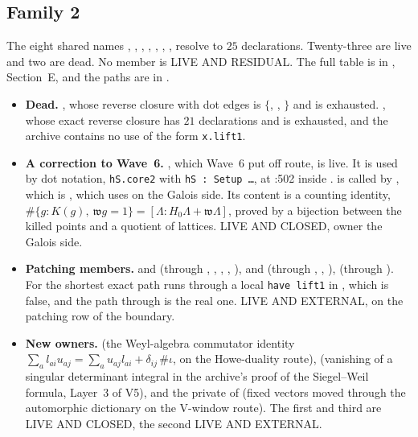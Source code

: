 \documentclass[11pt]{article}
\theoremstyle{remark}
\begin{document}
\subsection{Family 2}

The eight shared names , , , , , , ,  resolve to $25$ declarations. Twenty-three are live and two are dead. No member is LIVE AND RESIDUAL. The full table is in , Section~E, and the paths are in .

\begin{itemize}[nosep]
\item \textbf{Dead.} , whose reverse closure with dot edges is $\{$, , $\}$ and is exhausted. , whose exact reverse closure has $21$ declarations and is exhausted, and the archive contains no use of the form \texttt{x.lift1}.
\item \textbf{A correction to Wave~6.} , which Wave~6 put off route, is live. It is used by dot notation, \texttt{hS.core2} with \texttt{hS : Setup \ldots}, at :502 inside .  is called by , which is , which  uses on the Galois side. Its content is a counting identity, $\#\{g:K(g),\ \mathfrak w g=1\}=[\Lambda:H_0\Lambda+\mathfrak w\Lambda]$, proved by a bijection between the killed points and a quotient of lattices. LIVE AND CLOSED, owner the Galois side.
\item \textbf{Patching members.}  and  (through , , , , ),  and  (through , , ),  (through ). For  the shortest exact path runs through a local \texttt{have lift1} in , which is false, and the path through  is the real one. LIVE AND EXTERNAL, on the patching row of the boundary.
\item \textbf{New owners.}  (the Weyl-algebra commutator identity $\sum_al_{ai}u_{aj}=\sum_au_{aj}l_{ai}+\delta_{ij}\,\#\iota$, on the Howe-duality route),  (vanishing of a singular determinant integral in the archive's proof of the Siegel--Weil formula, Layer~3 of V5), and the private  of  (fixed vectors moved through the automorphic dictionary on the V-window route). The first and third are LIVE AND CLOSED, the second LIVE AND EXTERNAL.

\end{itemize}
\end{document}
